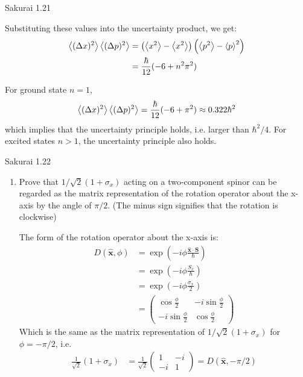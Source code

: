 \documentclass{article}
\begin{document}
\begin{section}{Sakurai 1.21}
\begin{tcolorbox}[breakable]
	Substituting these values into the uncertainty product, we get:
	\begin{align*}
		\left<(\Delta x)^2\right> \left<(\Delta p)^2\right> & = \left(\left<x^2\right> - \left<x^2\right>\right) \left(\left<p^2\right> - \left<p\right>^2\right) \\
		                                        & = \frac{\hbar}{12} (-6 + n^2 \pi^2)                                         \\
	\end{align*}

	For ground state $n=1$,
	\begin{align*}
		\left<(\Delta x)^2\right> \left<(\Delta p)^2\right> = \frac{\hbar}{12} (-6 + \pi^2) \approx 0.322 \hbar^2
	\end{align*}
	which implies that the uncertainty principle holds, i.e. larger than $\hbar^2/4$. For excited states $n > 1$, the uncertainty principle also holds.
\end{tcolorbox}

\begin{section}{Sakurai 1.22}
\begin{enumerate}
	\item Prove that $1/\sqrt{2} (1+\sigma_x)$ acting on a two-component spinor can be regarded as the matrix representation of the rotation operator about the x-axis by the angle of $\pi/2$. (The minus sign signifies that the rotation is clockwise)

	\begin{tcolorbox}
		The form of the rotation operator about the x-axis is:
		\begin{align*}
			D(\boldsymbol{\hat x}, \phi)
			 & = \exp(-i \phi \frac{\boldsymbol{\hat x \cdot S}}{\hbar}) \\
			 & = \exp(-i \phi \frac{S_x}{\hbar})                         \\
			 & = \exp(-i \phi \frac{\sigma_x}{2})                        \\
			 & = \begin{pmatrix}
				     \cos \frac{\phi}{2}    & -i \sin \frac{\phi}{2} \\
				     -i \sin \frac{\phi}{2} & \cos \frac{\phi}{2}
			     \end{pmatrix}
		\end{align*}
		Which is the same as the matrix representation of $1/\sqrt{2} (1+\sigma_x)$ for $\phi = -\pi/2$, i.e.
		\begin{align*}
			\frac{1}{\sqrt{2}} (1+\sigma_x)
			 & = \frac{1}{\sqrt{2}}
			\begin{pmatrix}
				1  & -i \\
				-i & 1
			\end{pmatrix}
			= D(\boldsymbol{\hat x}, -\pi/2)
		\end{align*}
	\end{tcolorbox}


\end{enumerate}
\end{section}
\end{section}
\end{document}
